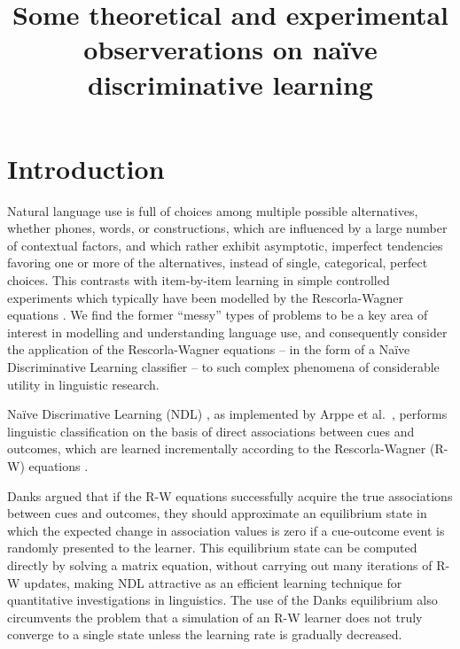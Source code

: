 \documentclass[conference]{IEEEtran}
\begin{document}
\title{Some theoretical and experimental observerations on naïve discriminative learning}
\author{
\and
{}
}

\maketitle



\section{Introduction}
\label{sec:intro}

Natural language use is full of choices among multiple possible alternatives, whether phones, words, or constructions, which are influenced by a large number of contextual factors, and which rather exhibit asymptotic, imperfect tendencies favoring one or more of the alternatives, instead of single, categorical, perfect choices. This contrasts with item-by-item learning in simple controlled experiments which typically have been modelled by the Rescorla-Wagner equations \cite{rescorlawagner1972}. We find the former ``messy'' types of problems to be a key area of interest in modelling and understanding language use, and consequently consider the application of the Rescorla-Wagner equations -- in the form of a Naïve Discriminative Learning classifier -- to such complex phenomena of considerable utility in linguistic research. 
  
Naïve Discrimative Learning (NDL) \cite{baayenetal2011, baayen2011}, as implemented by Arppe et al.\ \cite{shaoul2014}, performs linguistic classification on the basis of direct associations between cues and outcomes, which are learned incrementally according to the Rescorla-Wagner (R-W) equations \cite{rescorlawagner1972, milleretal1995}.

Danks \cite{danks2003} argued that if the R-W equations successfully acquire the true associations between cues and outcomes, they should approximate an equilibrium state in which the expected change in association values is zero if a cue-outcome event is randomly presented to the learner.  This equilibrium state can be computed directly by solving a matrix equation, without carrying out many iterations of R-W updates, making NDL attractive as an efficient learning technique for quantitative investigations in linguistics.  The use of the Danks equilibrium also circumvents the problem that a simulation of an R-W learner does not truly converge to a single state unless the learning rate is gradually decreased. 
\end{document}
